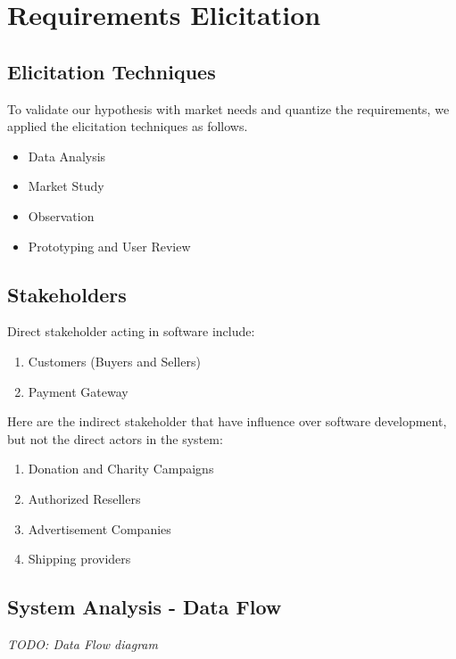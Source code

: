 %
%
\chapter{Requirements Elicitation}

\section{Elicitation Techniques}

To validate our hypothesis with market needs and quantize the requirements, we applied the elicitation techniques as follows.

\begin{itemize}
	\item Data Analysis
	\item Market Study
	\item Observation
	\item Prototyping and User Review
\end{itemize}

\section{Stakeholders}

Direct stakeholder acting in software include:

\begin{enumerate}
	\item Customers (Buyers and Sellers)
	\item Payment Gateway
\end{enumerate}

Here are the indirect stakeholder that have influence over software development, but not the direct actors in the system:

\begin{enumerate}
	\item Donation and Charity Campaigns
	\item Authorized Resellers
	\item Advertisement Companies
	\item Shipping providers
\end{enumerate}

\section{System Analysis - Data Flow}

\textit{TODO: Data Flow diagram}

